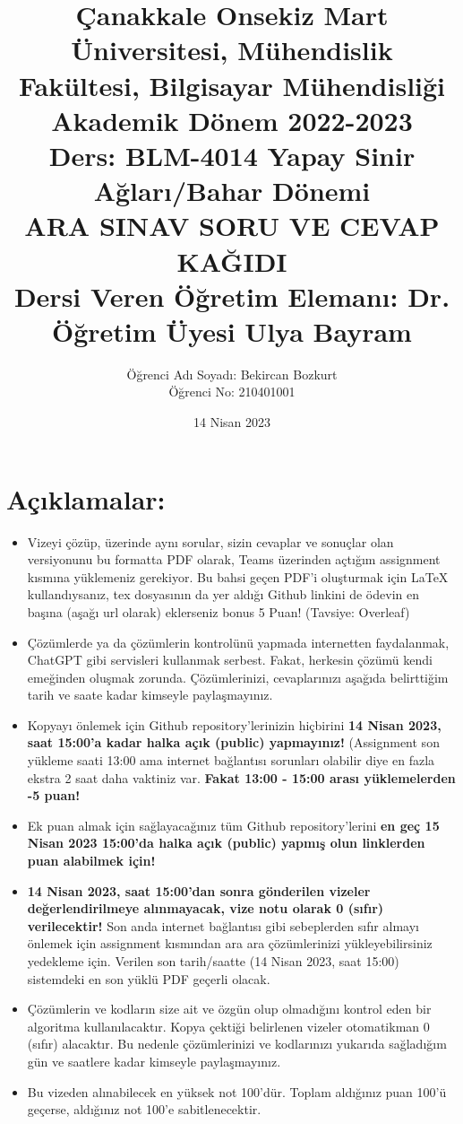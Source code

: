 \documentclass[11pt]{article}
\title{Çanakkale Onsekiz Mart Üniversitesi, Mühendislik Fakültesi, Bilgisayar Mühendisliği Akademik Dönem 2022-2023\\
Ders: BLM-4014 Yapay Sinir Ağları/Bahar Dönemi\\ 
ARA SINAV SORU VE CEVAP KAĞIDI\\
Dersi Veren Öğretim Elemanı: Dr. Öğretim Üyesi Ulya Bayram}
\author{%
\begin{minipage}{\textwidth}
\raggedright
Öğrenci Adı Soyadı: Bekircan Bozkurt\\ %
Öğrenci No: 210401001
\end{minipage}%
}
\date{14 Nisan 2023}
\begin{document}
\maketitle

\vspace{-.5in}
\section*{Açıklamalar:}
\begin{itemize}
    \item Vizeyi çözüp, üzerinde aynı sorular, sizin cevaplar ve sonuçlar olan versiyonunu bu formatta PDF olarak, Teams üzerinden açtığım assignment kısmına yüklemeniz gerekiyor. Bu bahsi geçen PDF'i oluşturmak için LaTeX kullandıysanız, tex dosyasının da yer aldığı Github linkini de ödevin en başına (aşağı url olarak) eklerseniz bonus 5 Puan! (Tavsiye: Overleaf)
    \item Çözümlerde ya da çözümlerin kontrolünü yapmada internetten faydalanmak, ChatGPT gibi servisleri kullanmak serbest. Fakat, herkesin çözümü kendi emeğinden oluşmak zorunda. Çözümlerinizi, cevaplarınızı aşağıda belirttiğim tarih ve saate kadar kimseyle paylaşmayınız. 
    \item Kopyayı önlemek için Github repository'lerinizin hiçbirini \textbf{14 Nisan 2023, saat 15:00'a kadar halka açık (public) yapmayınız!} (Assignment son yükleme saati 13:00 ama internet bağlantısı sorunları olabilir diye en fazla ekstra 2 saat daha vaktiniz var. \textbf{Fakat 13:00 - 15:00 arası yüklemelerden -5 puan!}
    \item Ek puan almak için sağlayacağınız tüm Github repository'lerini \textbf{en geç 15 Nisan 2023 15:00'da halka açık (public) yapmış olun linklerden puan alabilmek için!}
    \item \textbf{14 Nisan 2023, saat 15:00'dan sonra gönderilen vizeler değerlendirilmeye alınmayacak, vize notu olarak 0 (sıfır) verilecektir!} Son anda internet bağlantısı gibi sebeplerden sıfır almayı önlemek için assignment kısmından ara ara çözümlerinizi yükleyebilirsiniz yedekleme için. Verilen son tarih/saatte (14 Nisan 2023, saat 15:00) sistemdeki en son yüklü PDF geçerli olacak.
    \item Çözümlerin ve kodların size ait ve özgün olup olmadığını kontrol eden bir algoritma kullanılacaktır. Kopya çektiği belirlenen vizeler otomatikman 0 (sıfır) alacaktır. Bu nedenle çözümlerinizi ve kodlarınızı yukarıda sağladığım gün ve saatlere kadar kimseyle paylaşmayınız.
    \item Bu vizeden alınabilecek en yüksek not 100'dür. Toplam aldığınız puan 100'ü geçerse, aldığınız not 100'e sabitlenecektir.

\end{itemize}
\end{document}
